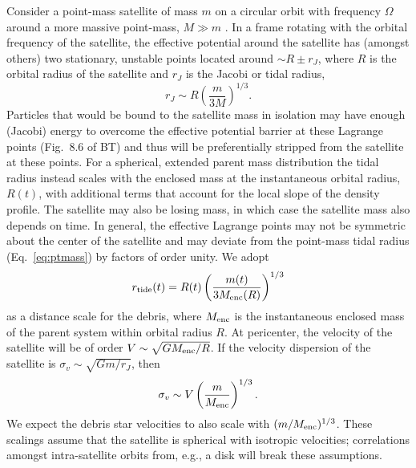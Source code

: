 \documentclass[letterpaper,12pt,preprint]{aastex}
\begin{document}
Consider a point-mass satellite of mass $m$ on a circular orbit with frequency $\Omega$ around a more massive point-mass, $M\gg m$ \citep[the restricted three-body problem; e.g., \S 8.3][]{binneytremaine}. In a frame rotating with the orbital frequency of the satellite, the effective potential around the satellite has (amongst others) two stationary, unstable points located around $\sim R \pm r_J$, where $R$ is the orbital radius of the satellite and $r_J$ is the Jacobi or tidal radius,
\begin{equation}
	r_J \sim R\left(\frac{m}{3M}\right)^{1/3}.\label{eq:ptmass}
\end{equation}
Particles that would be bound to the satellite mass in isolation may have enough (Jacobi) energy to overcome the effective potential barrier at these Lagrange points (Fig.~8.6 of BT) and thus will be preferentially stripped from the satellite at these points. For a spherical, extended parent mass distribution the tidal radius instead scales with the enclosed mass at the instantaneous orbital radius, $R(t)$, with additional terms that account for the local slope of the density profile. The satellite may also be losing mass, in which case the satellite mass also depends on time. In general, the effective Lagrange points may not be symmetric about the center of the satellite and may deviate from the point-mass tidal radius (Eq.~\ref{eq:ptmass}) by factors of order unity. We adopt 
\begin{equation}
	r_{\rm tide}(t) = R(t)\left(\frac{m(t)}{3M_{\rm enc}(R)}\right)^{1/3}\label{eq:tidalradius}
\end{equation}
as a distance scale for the debris, where $M_{\rm enc}$ is the instantaneous enclosed mass of the parent system within orbital radius $R$. At pericenter, the velocity of the satellite will be of order $V\sim \sqrt{GM_{\rm enc}/R}$. If the velocity dispersion of the satellite is $\sigma_v \sim \sqrt{Gm/r_J}$, then
\begin{equation}
	\sigma_v \sim V\left(\frac{m}{M_{\rm enc}}\right)^{1/3}\label{eq:velscale}.
\end{equation}
We expect the debris star velocities to also scale with $(m/M_{\rm enc})^{1/3}$. These scalings assume that the satellite is spherical with isotropic velocities; correlations amongst intra-satellite orbits from, e.g., a disk will break these assumptions. 
\end{document}
